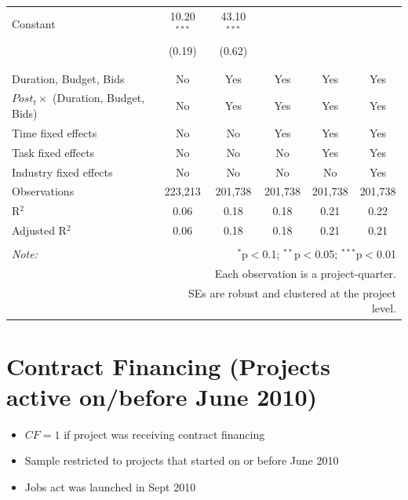 \documentclass[
]{article}
\providecommand{\tightlist}{%
  \setlength{\itemsep}{0pt}\setlength{\parskip}{0pt}}
\begin{document}
\begin{table}[H]
\begin{tabular}{@{\extracolsep{-2pt}}lccccc}
 Constant & 10.20$^{***}$ & 43.10$^{***}$ &  &  &  \\ 
  & (0.19) & (0.62) &  &  &  \\ 
  & & & & & \\ 
\hline \\[-1.8ex] 
Duration, Budget, Bids & No & Yes & Yes & Yes & Yes \\ 
$Post_t \times $  (Duration, Budget, Bids) & No & Yes & Yes & Yes & Yes \\ 
Time fixed effects & No & No & Yes & Yes & Yes \\ 
Task fixed effects & No & No & No & Yes & Yes \\ 
Industry fixed effects & No & No & No & No & Yes \\ 
Observations & 223,213 & 201,738 & 201,738 & 201,738 & 201,738 \\ 
R$^{2}$ & 0.06 & 0.18 & 0.18 & 0.21 & 0.22 \\ 
Adjusted R$^{2}$ & 0.06 & 0.18 & 0.18 & 0.21 & 0.21 \\ 
\hline 
\hline \\[-1.8ex] 
\textit{Note:}  & \multicolumn{5}{r}{$^{*}$p$<$0.1; $^{**}$p$<$0.05; $^{***}$p$<$0.01} \\ 
 & \multicolumn{5}{r}{Each observation is a project-quarter.} \\ 
 & \multicolumn{5}{r}{SEs are robust and clustered at the project level.} \\ 
\end{tabular} 
\end{table}

\hypertarget{contract-financing-projects-active-onbefore-june-2010}{%
\section{Contract Financing (Projects active on/before June
2010)}\label{contract-financing-projects-active-onbefore-june-2010}}

\begin{itemize}
\tightlist
\item
  \(CF=1\) if project was receiving contract financing
\item
  Sample restricted to projects that started on or before June 2010
\item
  Jobs act was launched in Sept 2010
\end{itemize}
\end{document}
